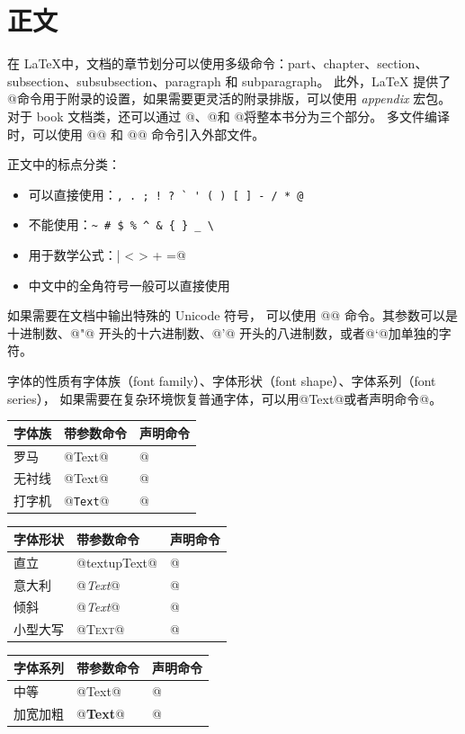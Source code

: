 \section{正文}
在 \LaTeX 中，文档的章节划分可以使用多级命令：part、chapter、section、subsection、subsubsection、paragraph 和 subparagraph。
此外，LaTeX 提供了 @\appendix@ 命令用于附录的设置，如果需要更灵活的附录排版，可以使用 \emph{appendix} 宏包。
对于 book 文档类，还可以通过 @\frontmatter@、@\mainmatter@ 和 @\backmatter@ 将整本书分为三个部分。
多文件编译时，可以使用 @@ 和 @@ 命令引入外部文件。

正文中的标点分类：
\begin{itemize}[itemsep=0pt, parsep=0pt]
	\item 可以直接使用：\verb|, . ; ! ? ` ' ( ) [ ] - / * @|
	\item 不能使用：\verb|~ # $ % ^ & { } _ \|
	\item 用于数学公式：\verb@| < > + =@
	\item 中文中的全角符号一般可以直接使用
\end{itemize}

如果需要在文档中输出特殊的 Unicode 符号，
可以使用 @\symbol{}@ 命令。其参数可以是十进制数、@"@ 开头的十六进制数、@'@ 开头的八进制数，或者@`@加单独的字符。

字体的性质有字体族（font family）、字体形状（font shape）、字体系列（font series），
如果需要在复杂环境恢复普通字体，可以用@\textnormal{Text}@或者声明命令@\normalfont@。
\begin{table}[ht]
	\centering
	\begin{tabular}{|lll|}
		\hline
		字体族 & 带参数命令           & 声明命令        \\
		\hline
		罗马  & @\textrm{Text}@ & @\rmfamily@ \\
		无衬线 & @\textsf{Text}@ & @\sffamily@ \\
		打字机 & @\texttt{Text}@ & @\ttfamily@ \\
		\hline
	\end{tabular}%
	\qquad
	\begin{tabular}{|lll|}
		\hline
		字体形状 & 带参数命令           & 声明命令       \\
		\hline
		直立   & @textup{Text}@  & @\upshape@ \\
		意大利  & @\textit{Text}@ & @\itshape@ \\
		倾斜   & @\textsl{Text}@ & @\slshape@ \\
		小型大写 & @\textsc{Text}@ & @\scshape@ \\
		\hline
	\end{tabular}
\end{table}
\begin{table}[ht]
	\centering
	\begin{tabular}{|lll|}
		\hline
		字体系列 & 带参数命令           & 声明命令        \\
		\hline
		中等   & @\textmd{Text}@ & @\mdseries@ \\
		加宽加粗 & @\textbf{Text}@ & @\bfseries@ \\
		\hline
	\end{tabular}
\end{table}

